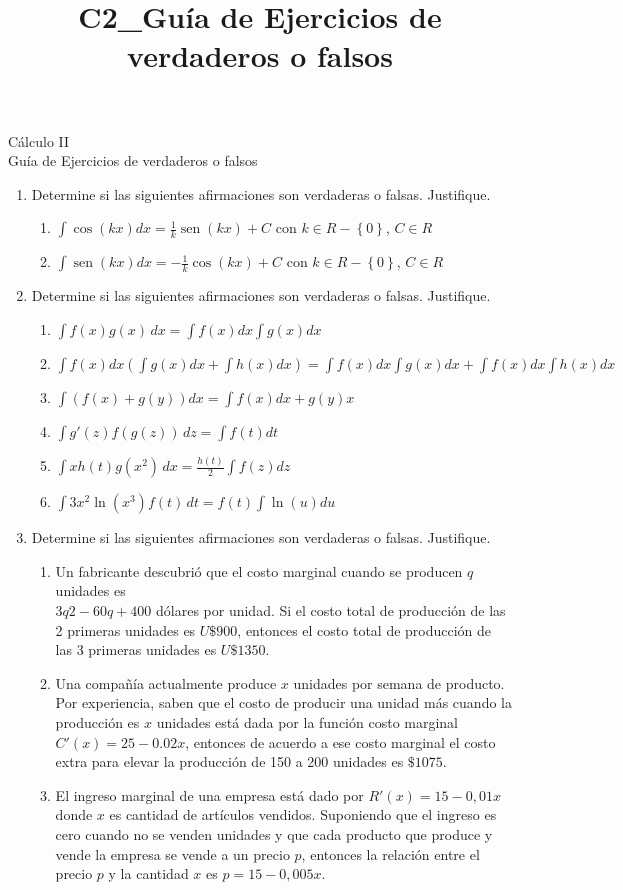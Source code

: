 \documentclass[a4paper,10pt]{article}
\title{C2_Guía de Ejercicios de verdaderos o falsos}
\newcommand{\dis}{\displaystyle}
\def\sin{\operatorname{sen}}
\begin{document}
\begin{center}
Cálculo II\\
Guía de Ejercicios de verdaderos o falsos\\
\end{center}
\vspace{10mm}

\begin{enumerate}


\item Determine si las siguientes afirmaciones son verdaderas o falsas. Justifique.
\begin{enumerate}[label=\emph{\alph*)}]
\item $\dis \int \cos(kx)dx = \frac{1}{k}\sin(kx)+C$ con $k \in R - \left\{ 0\right\}$, $C \in R$
\item $\dis \int \sin(kx)dx = -\frac{1}{k}\cos(kx)+C$ con $k \in R - \left\{ 0\right\}$, $C \in R$
\end{enumerate}

\item Determine si las siguientes afirmaciones son verdaderas o falsas. Justifique.
\begin{enumerate}[label=\emph{\alph*)}]
\item $\dis \int f(x) g(x)\, dx = \dis \int f(x)dx \int g(x)dx$
\item $\dis \int f(x)dx(\int g(x)dx + \int h(x)dx) = \dis  \int f(x)dx\int g(x)dx + \int f(x)dx\int h(x)dx$
\item $\dis \int (f(x) +  g(y))dx = \dis  \int f(x)dx +  g(y)x$
\item $\dis \int g'(z) f(g(z))\, dz = \dis \int f(t)dt$
\item $\dis \int xh(t)g(x^2)\, dx = \frac{h(t)}{2}\dis \int f(z)dz$
\item $\dis \int 3x^2 \ln(x^3)f(t)\, dt = f(t)\dis \int \ln(u)du$
\end{enumerate}

\item  Determine si las siguientes afirmaciones son verdaderas o falsas. Justifique.
\begin{enumerate}[label=\emph{\alph*)}]
\item Un fabricante descubrió que el costo marginal cuando se producen $q$ unidades es \\ $3q2 -60q+400$ dólares por unidad. Si el costo total de producción de las 2 primeras unidades es $U\$900$, entonces  el costo total de producción de las 3 primeras unidades es $U\$1350$.
\item Una compañía actualmente produce $x$ unidades por semana de producto. Por experiencia, saben que el costo de producir una unidad más cuando la producción es $x$ unidades está dada por la función costo marginal $C'(x)= 25-0.02x$, entonces de acuerdo a ese costo marginal  el costo extra para elevar la producción de 150 a 200 unidades  es $\$1075$. 
\item El ingreso marginal de una empresa está dado por $R'(x) =15-0,01x$ donde $x$ es cantidad de artículos vendidos. Suponiendo que el ingreso es cero cuando no se venden unidades y que cada producto que produce y vende la empresa  se vende a un precio $p$, entonces la relación entre el precio $p$ y la cantidad $x$ es $p= 15-0,005x$.


\end{enumerate}
\end{enumerate}
\end{document}
